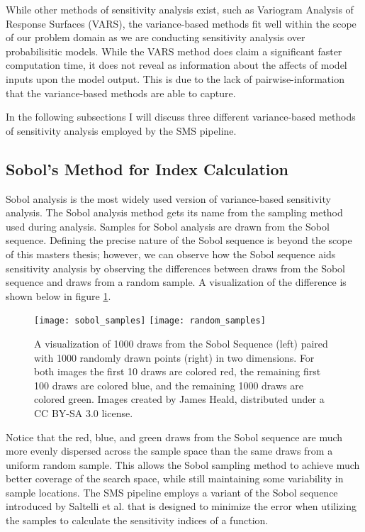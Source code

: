 While other methods of sensitivity analysis exist, such as Variogram Analysis of Response Surfaces (VARS), the variance-based methods fit well within the scope of our problem domain as we are conducting sensitivity analysis over probabilisitic models. While the VARS method does claim a significant faster computation time, it does not reveal as information about the affects of model inputs upon the model output. This is due to the lack of pairwise-information that the variance-based methods are able to capture.

In the following subsections I will discuss three different variance-based methods of sensitivity analysis employed by the SMS pipeline.

\subsection{Sobol's Method for Index Calculation\label{sec:sobol_analysis}}
Sobol analysis is the most widely used version of variance-based sensitivity analysis. The Sobol analysis method gets its name from the sampling method used during analysis. Samples for Sobol analysis are drawn from the Sobol sequence. Defining the precise nature of the Sobol sequence is beyond the scope of this masters thesis; however, we can observe how the Sobol sequence aids sensitivity analysis by observing the differences between draws from the Sobol sequence and draws from a random sample. A visualization of the difference is shown below in figure \ref{sobol_seq_vis}.

\FloatBarrier
\begin{figure}[!htbp]
    \label{sobol_seq_vis}
    \centering
    \texttt{[image: sobol\_samples]}\hfill
    \texttt{[image: random\_samples]}
    \caption[Sobol Sequence Visualization]{A visualization of 1000 draws from the Sobol Sequence (left) paired with 1000 randomly drawn points (right) in two dimensions. For both images the first 10 draws are colored red, the remaining first 100 draws are colored blue, and the remaining 1000 draws are colored green. Images created by James Heald, distributed under a CC BY-SA 3.0 license.}
\end{figure}
\FloatBarrier

Notice that the red, blue, and green draws from the Sobol sequence are much more evenly dispersed across the sample space than the same draws from a uniform random sample. This allows the Sobol sampling method to achieve much better coverage of the search space, while still maintaining some variability in sample locations. The SMS pipeline employs a variant of the Sobol sequence introduced by Saltelli et al. that is designed to minimize the error when utilizing the samples to calculate the sensitivity indices of a function.

